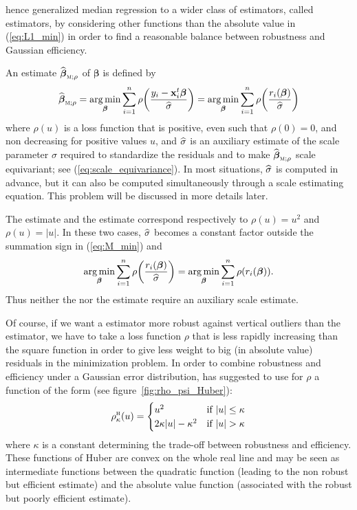 \citet{huber64} hence generalized median regression to a wider class of
estimators, called  estimators, by considering other functions than
the absolute value in (\ref{eq:L1_min}) in order to find a reasonable balance
between robustness and Gaussian efficiency.

An  estimate $\sthat{\boldsymbol\beta}_{\stsc{M};\rho}$ of
$\boldsymbol\beta$ is defined by
%
\begin{equation}
    \label{eq:M_min}
    \sthat{\boldsymbol\beta}_{\stsc{M};\rho} 
        = \argmin_{\boldsymbol\beta}\sum_{i=1}^{n} 
            \rho\left(\frac{y_{i} - \stvec{x}_{i}^t\boldsymbol\beta}{\sthat{\sigma}}\right)
        = \argmin_{\boldsymbol\beta}\sum_{i=1}^{n}
            \rho\left(\frac{r_{i}(\boldsymbol\beta)}{\sthat{\sigma}}\right)
\end{equation}
%
where $\rho(u)$ is a loss function that is positive, even such that $\rho(0) =
0$, and non decreasing for positive values $u$, and $\widehat{\sigma}$ is an
auxiliary estimate of the scale parameter $\sigma$ required to standardize the
residuals and to make $\sthat{\boldsymbol\beta}_{\stsc{M};\rho}$ scale
equivariant; see (\ref{eq:scale_equivariance}). In most situations,
$\widehat{\sigma}$ is computed in advance, but it can also be computed
simultaneously through a scale  estimating equation. This problem will
be discussed in more details later.

\begin{stremark}
The  estimate and the  estimate correspond respectively to
$\rho(u) = u^{2}$ and $\rho(u) = |u|$. In these two cases, $\widehat{\sigma}$
becomes a constant factor outside the summation sign in (\ref{eq:M_min}) and
\[
    \argmin_{\boldsymbol\beta} \sum_{i=1}^{n} \rho\left(\frac{r_{i}(\boldsymbol\beta)}{\sthat{\sigma}}\right)
    = \argmin_{\boldsymbol\beta}\sum_{i=1}^{n}\rho(r_{i}(\boldsymbol\beta)).
\]
Thus neither the  nor the  estimate require an auxiliary
scale estimate.
\end{stremark}

Of course, if we want a  estimator more robust against vertical
outliers than the  estimator, we have to take a loss function $\rho$
that is less rapidly increasing than the square function in order to give less
weight to big (in absolute value) residuals in the minimization problem. In
order to combine robustness and efficiency under a Gaussian error distribution,
\citet{huber64} has suggested to use for $\rho$ a function of the form (see
figure~\ref{fig:rho_psi_Huber}):
\[
    \rho_{\kappa}^{\stsc{H}}(u) = 
    \begin{cases}
        u^{2}                    & \text{if $|u| \leq \kappa$}\\
        2\kappa |u| - \kappa^{2} & \text{if $|u| > \kappa$}
    \end{cases}
\]
where $\kappa$ is a constant determining the trade-off between robustness and
efficiency. These functions of Huber are convex on the whole real line and may
be seen as intermediate functions between the quadratic function (leading to
the non robust but efficient  estimate) and the absolute value function
(associated with the robust but poorly efficient  estimate).

